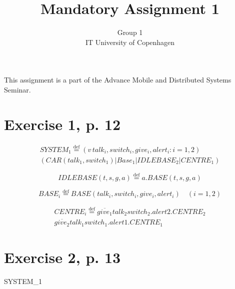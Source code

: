 \documentclass[11pt]{article}
\begin{document}
\title{Mandatory Assignment 1}
\author{Group 1\\
IT University of Copenhagen}
\renewcommand{\today}{September 22, 2012}
\maketitle
This assignment is a part of the Advance Mobile and Distributed Systems Seminar.

\section {Exercise 1, p. 12}

\begin{equation}
\begin{split}
SYSTEM_1 \stackrel{\mathrm{def}}{=} (v\,talk_i , switch_i , give_i , alert_i : i = 1,2) \\
(CAR(talk_1 , switch_1) | Base_1 | IDLEBASE_2 | CENTRE_1)
\end{split}
\end{equation}

\begin{equation}
IDLEBASE(t, s, g, a) \stackrel{\mathrm{def}}{=} a.BASE(t,s,g,a)
\end{equation}

\begin{equation}
BASE_i \stackrel{\mathrm{def}}{=} BASE(talk_i , switch_i , give_i , alert_i) \quad (i=1,2)
\end{equation}

\begin{equation}
\begin{split}
CENTRE_i \stackrel{\mathrm{def}}{=} \overline{give_1}talk_2switch_2.alert2.CENTRE_2 \\ 
\overline{give_2}talk_1switch_1.alert1.CENTRE_1 
\end{split}
\end{equation}


\section{Exercise 2, p. 13}

SYSTEM_1 \stackrel{}{=}
\end{document}
